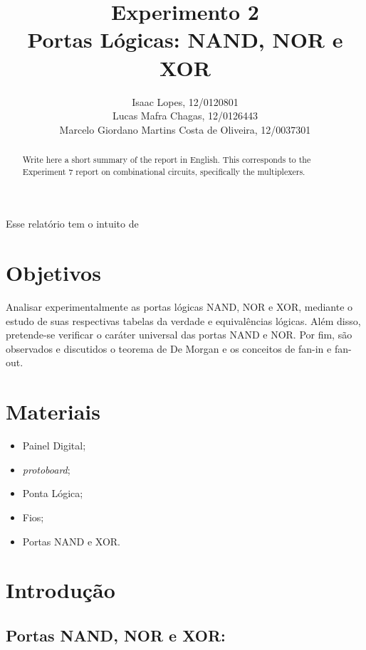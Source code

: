 \documentclass[12pt]{article}
\title{Experimento 2\\ 
	Portas Lógicas: NAND, NOR e XOR }
\author{Isaac Lopes, 12/0120801\\
	Lucas Mafra Chagas, 12/0126443 \\
	Marcelo Giordano Martins Costa de Oliveira,  12/0037301
}
\begin{document}
 

\maketitle

 \begin{abstract}
   Write here a short summary of the report in English. This corresponds to the Experiment 7 report on combinational circuits, specifically the multiplexers.
 \end{abstract}
     
 \begin{resumo} 
  Esse relatório tem o intuito de 
 \end{resumo}


\section{Objetivos}
\label{sec:Objetivos}

Analisar experimentalmente as portas lógicas NAND, NOR e XOR, mediante o estudo de suas respectivas tabelas da verdade e equivalências lógicas. Além disso, pretende-se verificar o caráter universal das portas NAND e NOR. Por fim, são observados e discutidos o teorema de De Morgan e os conceitos de fan-in e fan-out. 


\section{Materiais} 
\label{sec:Materiais}

\begin{itemize}
    \item Painel Digital;
    
    \item \textit{protoboard};
    
    \item Ponta Lógica;
    
    \item Fios;
    
    \item Portas NAND e XOR.
    
\end{itemize}


\section{Introdução}
\label{sec:Introducao}


\subsection{Portas NAND, NOR e XOR:}
\end{document}
